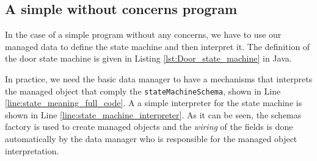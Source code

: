 \subsection{A simple without concerns program}
In the case of a simple program without any concerns, we have to use our managed data to define the state machine and then interpret it.
The definition of the door state machine is given in Listing \ref{lst:Door_state_machine} in Java.

In practice, we need the basic data manager to have a mechanisms that interprets the managed object that comply the \texttt{stateMachineSchema}, shown in Line \ref{line:state_meaning_full_code}.
A a simple interpreter for the state machine is shown in Line \ref{line:state_machine_interpreter}.
As it can be seen, the schemas factory is used to create managed objects and the \textit{wiring} of the fields is done automatically by the data manager who is responsible for the managed object interpretation.

